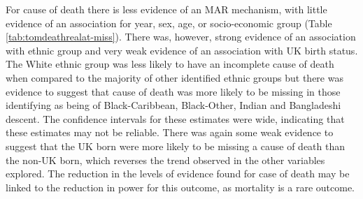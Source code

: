 \documentclass[11pt,twoside]{bristolthesis}
\begin{document}
  For cause of death there is less evidence of an MAR mechanism, with little evidence of an association for year, sex, age, or socio-economic group (Table \ref{tab:tomdeathrealat-miss}). There was, however, strong evidence of an association with ethnic group and very weak evidence of an association with UK birth status. The White ethnic group was less likely to have an incomplete cause of death when compared to the majority of other identified ethnic groups but there was evidence to suggest that cause of death was more likely to be missing in those identifying as being of Black-Caribbean, Black-Other, Indian and Bangladeshi descent. The confidence intervals for these estimates were wide, indicating that these estimates may not be reliable. There was again some weak evidence to suggest that the UK born were more likely to be missing a cause of death than the non-UK born, which reverses the trend observed in the other variables explored. The reduction in the levels of evidence found for case of death may be linked to the reduction in power for this outcome, as mortality is a rare outcome.
  
\end{document}

